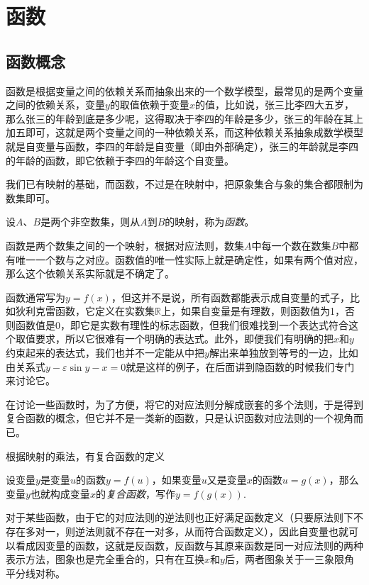 
\section{函数}
\label{sec:function}


\subsection{函数概念}
\label{sec:function-concept}

函数是根据变量之间的依赖关系而抽象出来的一个数学模型，最常见的是两个变量之间的依赖关系，变量$y$的取值依赖于变量$x$的值，比如说，张三比李四大五岁，那么张三的年龄到底是多少呢，这得取决于李四的年龄是多少，张三的年龄在其上加五即可，这就是两个变量之间的一种依赖关系，而这种依赖关系抽象成数学模型就是自变量与函数，李四的年龄是自变量（即由外部确定），张三的年龄就是李四的年龄的函数，即它依赖于李四的年龄这个自变量。

我们已有映射的基础，而函数，不过是在映射中，把原象集合与象的集合都限制为数集即可。
\begin{definition}
  设$A$、$B$是两个非空数集，则从$A$到$B$的映射，称为\emph{函数}。
\end{definition}

函数是两个数集之间的一个映射，根据对应法则，数集$A$中每一个数在数集$B$中都有唯一一个数与之对应。函数值的唯一性实际上就是确定性，如果有两个值对应，那么这个依赖关系实际就是不确定了。

函数通常写为$y=f(x)$，但这并不是说，所有函数都能表示成自变量的式子，比如狄利克雷函数，它定义在实数集$\mathbb{R}$上，如果自变量是有理数，则函数值为1，否则函数值是0，即它是实数有理性的标志函数，但我们很难找到一个表达式符合这个取值要求，所以它很难有一个明确的表达式。此外，即便我们有明确的把$x$和$y$约束起来的表达式，我们也并不一定能从中把$y$解出来单独放到等号的一边，比如由关系式$y-\varepsilon \sin{y}-x=0$就是这样的例子，在后面讲到隐函数的时候我们专门来讨论它。

在讨论一些函数时，为了方便，将它的对应法则分解成嵌套的多个法则，于是得到复合函数的概念，但它并不是一类新的函数，只是认识函数对应法则的一个视角而已。

根据映射的乘法，有复合函数的定义
\begin{definition}
设变量$y$是变量$u$的函数$y=f(u)$，如果变量$u$又是变量$x$的函数$u=g(x)$，那么变量$y$也就构成变量$x$的\emph{复合函数}，写作$y=f(g(x))$.  
\end{definition}

对于某些函数，由于它的对应法则的逆法则也正好满足函数定义（只要原法则下不存在多对一，则逆法则就不存在一对多，从而符合函数定义），因此自变量也就可以看成因变量的函数，这就是反函数，反函数与其原来函数是同一对应法则的两种表示方法，图象也是完全重合的，只有在互换$x$和$y$后，两者图象关于一三象限角平分线对称。

